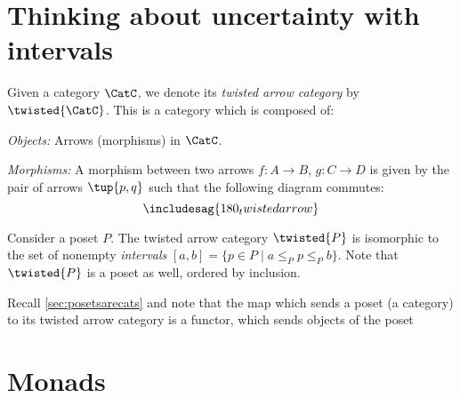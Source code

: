\section{Thinking about uncertainty with intervals}






\begin{shaded}
\begin{definition}
Given a category $\CatC$, we denote its \emph{twisted arrow category} by $\twisted{\CatC}$. This is a category which is composed of:
\begin{compactenum}
    \item \emph{Objects:} Arrows (morphisms) in $\CatC$.
    \item \emph{Morphisms:} A morphism between two arrows $f\colon A\to B$, $g\colon C\to D$ is given by the pair of arrows $\tup{p,q}$ such that the following diagram commutes:
    \begin{equation}
    \includesag{180_twistedarrow}
    \end{equation}
\end{compactenum} 
\end{definition}
\end{shaded}

\begin{example}[Intervals]
Consider a poset $P$. The twisted arrow category $\twisted{P}$ is isomorphic to the set of nonempty \emph{intervals} $[a,b]=\{p \in P\mid a\leq_P p \leq_P b\}$. Note that $\twisted{P}$ is a poset as well, ordered by inclusion.
\end{example}
\begin{remark}
Recall \cref{sec:posetsarecats} and note that the map which sends a poset (a category) to its twisted arrow category is a functor, which sends objects of the poset
\end{remark}

\section{Monads}

